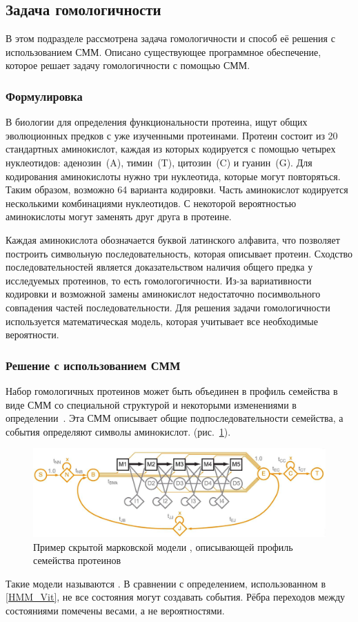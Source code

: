 \subsection{Задача гомологичности}
В этом подразделе рассмотрена задача гомологичности и способ её решения с 
использованием СММ.
Описано существующее программное обеспечение, которое решает задачу
гомологичности с помощью СММ.

\subsubsection{Формулировка}
В биологии для определения функциональности протеина, ищут общих эволюционных
предков с уже изученными протеинами.
Протеин состоит из 20 стандартных аминокислот, каждая из которых кодируется 
с помощью четырех нуклеотидов: аденозин~(A), тимин~(T), цитозин~(C) и 
гуанин~(G).
Для кодирования аминокислоты нужно три нуклеотида, которые могут повторяться.
Таким образом, возможно 64 варианта кодировки.
Часть аминокислот кодируется несколькими комбинациями нуклеотидов.
С некоторой вероятностью аминокислоты могут заменять друг друга в протеине.

Каждая аминокислота обозначается буквой латинского алфавита, что позволяет 
построить символьную последовательность, которая описывает протеин.
Сходство последовательностей является доказательством наличия общего предка у 
исследуемых протеинов, то есть гомологогичности.
Из-за вариативности кодировки и возможной замены 
аминокислот недостаточно посимвольного совпадения частей 
последовательности.
Для решения задачи гомологичности используется математическая модель, которая учитывает все необходимые вероятности.

\subsubsection{Решение с использованием СММ}
\label{HMM_solution}
Набор гомологичных протеинов может быть объединен в профиль 
семейства в виде СММ со специальной структурой и некоторыми 
изменениями в определении~\cite{HMM_Eddy}.
Эта СММ описывает общие подпоследовательности семейства, 
а события определяют символы аминокислот.
(рис.~\ref{HMM_example}).
\begin{figure}[b]
  \centering
  \includegraphics[width=\columnwidth]{HMM.png}
  \caption{Пример скрытой марковской модели , описывающей 
	профиль семейства протеинов~\cite{MSV_Eddy}}
  \label{HMM_example}
\end{figure}
Такие модели называются .
В сравнении с определением, использованном в \ref{HMM_Vit},
не все состояния могут создавать события.
Рёбра переходов между состояниями помечены весами, 
а не вероятностями.

